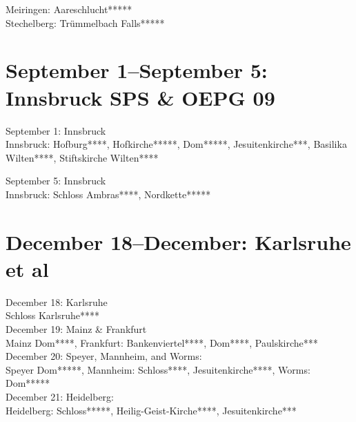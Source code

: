 Meiringen: Aareschlucht*****\\
Stechelberg: Tr\"ummelbach Falls*****

\section{September 1--September 5: Innsbruck SPS \& OEPG 09}
\label{2009:Innsbruck}

September 1: Innsbruck\\

Innsbruck: Hofburg****, Hofkirche*****, Dom*****, Jesuitenkirche***, Basilika Wilten****, Stiftskirche Wilten****

September 5: Innsbruck\\

Innsbruck: Schloss Ambras****, Nordkette*****

\section{December 18--December: Karlsruhe et al}

December 18: Karlsruhe\\
Schloss Karlsruhe****\\

December 19: Mainz \& Frankfurt\\
Mainz Dom****, Frankfurt: Bankenviertel****, Dom****, Paulskirche***\\

December 20: Speyer, Mannheim, and Worms:\\
Speyer Dom*****, Mannheim: Schloss****, Jesuitenkirche****, Worms: Dom*****\\

December 21: Heidelberg:\\
Heidelberg: Schloss*****, Heilig-Geist-Kirche****, Jesuitenkirche***